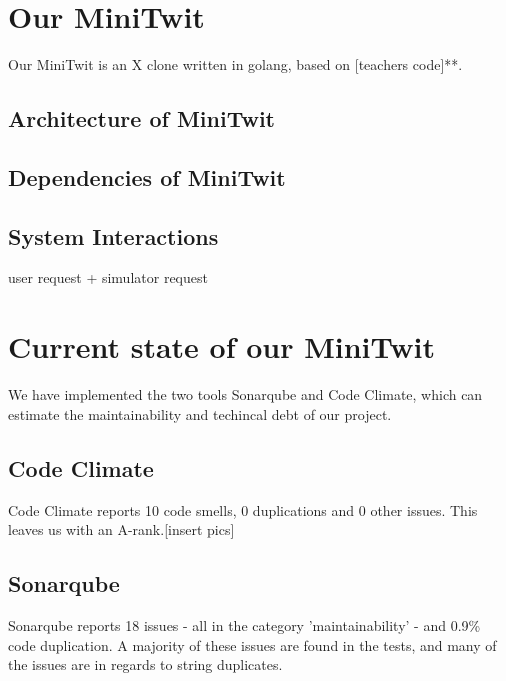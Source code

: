 \section{Our MiniTwit}
Our MiniTwit is an X clone written in golang, based on [teachers code]**.  

\subsection{Architecture of MiniTwit}

\subsection{Dependencies of MiniTwit}

\subsection{System Interactions}
user request + simulator request

\section{Current state of our MiniTwit}
We have implemented the two tools Sonarqube and Code Climate, which can estimate the maintainability and techincal debt of our project.\\
\subsection{Code Climate}
Code Climate reports 10 code smells, 0 duplications and 0 other issues. This leaves us with an A-rank.[insert pics]\\

\subsection{Sonarqube}
Sonarqube reports 18 issues - all in the category 'maintainability' - and 0.9\% code duplication. A majority of these issues are found in the tests, and many of the issues are in regards to string duplicates.\\
[insert pics from sonarqube]
